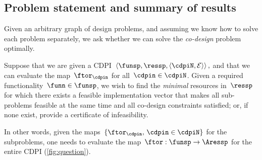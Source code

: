 


\subsection{Problem statement and summary of results\label{sec:Optimization}}

Given an arbitrary graph of design problems, and assuming we know
how to solve each problem separately, we ask whether we can solve
the \emph{co-design} problem optimally.
\begin{problem}
\label{prob:MCDP}Suppose that we are given a CDPI~$\left\langle \funsp,\ressp,\left\langle \cdpiN,\mathcal{E}\right\rangle \right\rangle ,$
and that we can evaluate the map~$\ftor_{\cdpin}$ for all~$\cdpin\in\cdpiN$.
Given a required functionality~$\funn\in\funsp$, we wish to find
the \emph{minimal} resources in~$\ressp$ for which there exists
a feasible implementation vector that makes all sub-problems feasible
at the same time and all co-design constraints satisfied; or, if
none exist, provide a certificate of infeasibility.
\end{problem}
In other words, given the maps~$\{\ftor_{\cdpin},\,\cdpin\in\cdpiN\}$
for the subproblems, one needs to evaluate the map~$\ftor:\funsp\rightarrow\Aressp$
for the entire CDPI (\cref{fig:question}).

